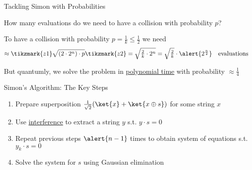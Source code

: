 \documentclass{beamer}
\begin{document}
\begin{frame}{Tackling Simon with Probabilities}

        How many evaluations do we need to have a collision
        with probability $p$?

        \pause
        To have a collision with probability $p =
        \frac{1}{k} \leq \frac{1}{2}$ we need  
        \[
                \approx \tikzmark{z1} \sqrt{(2 \cdot 2^n) \cdot p} \tikzmark{z2} = 
                \textstyle{\sqrt{\frac{2}{k} \cdot 2^n} }
                = \sqrt{\frac{2}{k}} \cdot \alert{2^{\frac{n}{2}}}
                \quad \text{evaluations}
        \]


        \pause
        But quantumly, we solve the problem in \alert{\underline{polynomial time}} with
        probability $\approx \textstyle{\frac{1}{4}}$
\end{frame}

\begin{frame}{Simon's Algorithm: The Key Steps}
       \begin{enumerate}
                \item Prepare superposition $\frac{1}{\sqrt{2}}(\ket{x} +
                        \ket{x \oplus s})$ for some string $x$
                \item Use \alert{\underline{interference}} to extract a string $y$ s.t.
                        $y \cdot s = 0$
                \item Repeat previous steps $\alert{n-1}$ times to obtain system of 
                        equations s.t. $y_k \cdot s = 0$
                \item Solve the system for $s$ using 
                        Gaussian elimination
       \end{enumerate}
\end{frame}
\end{document}
